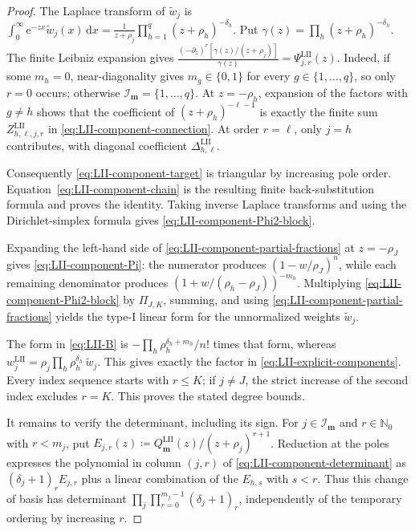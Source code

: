 \documentclass[10pt]{amsart}
\newcommand{\Nzero}{\mathbb N_0}
\newcommand{\e}{\mathrm e}
\newcommand{\dd}{\,\mathrm d}
\newcommand{\mm}{\boldsymbol m}
\theoremstyle{plain}
\theoremstyle{definition}
\theoremstyle{remark}
\begin{document}
\begin{proof}
The Laplace transform of \(\widetilde w_j\) is
\(\int_0^\infty\e^{-zx}\widetilde w_j(x)\dd x
=\frac1{z+\rho_j}\prod_{h=1}^q(z+\rho_h)^{-\delta_h}\).
Put \(\gamma(z)=\prod_h(z+\rho_h)^{-\delta_h}\).  The finite Leibniz
expansion gives
\(\frac{(-\partial_z)^r[\gamma(z)/(z+\rho_j)]}{\gamma(z)}
=\Psi_{j,r}^{\mathrm{LII}}(z)\).
Indeed, if some \(m_h=0\), near-diagonality gives
\(m_g\in\{0,1\}\) for every \(g\in\{1,\ldots,q\}\), so only
\(r=0\) occurs; otherwise
\(\mathcal I_{\mm}=\{1,\ldots,q\}\).
At \(z=-\rho_h\), expansion of the factors with \(g\ne h\) shows that
the coefficient of \((z+\rho_h)^{-\ell-1}\) is exactly the finite sum
\(Z_{h,\ell,j,r}^{\mathrm{LII}}\) in
\eqref{eq:LII-component-connection}.  At order \(r=\ell\), only
\(j=h\) contributes, with diagonal coefficient
\(\Delta_{h,\ell}^{\mathrm{LII}}\).

Consequently \eqref{eq:LII-component-target} is triangular by increasing
pole order.
Equation~\eqref{eq:LII-component-chain} is the resulting finite
back-substitution formula and proves the identity.
Taking inverse Laplace transforms and using the Dirichlet-simplex
formula gives \eqref{eq:LII-component-Phi2-block}.

Expanding the left-hand side of
\eqref{eq:LII-component-partial-fractions} at
\(z=-\rho_J\) gives \eqref{eq:LII-component-Pi}: the numerator produces
\((1-w/\rho_J)^n\), while each remaining denominator produces
\((1+w/(\rho_h-\rho_J))^{-m_h}\).  Multiplying
\eqref{eq:LII-component-Phi2-block} by \(\Pi_{J,K}\), summing, and using
\eqref{eq:LII-component-partial-fractions} yields the type-I linear form
for the unnormalized weights \(\widetilde w_j\).

The form in \eqref{eq:LII-B} is
\(-\prod_h\rho_h^{\delta_h+m_h}/n!\) times that form, whereas
\(w_j^{\mathrm{LII}}
=\rho_j\prod_h\rho_h^{\delta_h}\,\widetilde w_j\).
This gives exactly the factor in \eqref{eq:LII-explicit-components}.
Every index sequence starts with \(r\le K\); if \(j\ne J\), the strict
increase of the second index excludes \(r=K\). This proves the stated degree
bounds.

It remains to verify the determinant, including its sign. For
\(j\in\mathcal I_{\mm}\) and \(r\in\Nzero\) with \(r<m_j\), put
\(E_{j,r}(z)\coloneq Q_{\mm}^{\mathrm{LII}}(z)/(z+\rho_j)^{r+1}\).
Reduction at the poles expresses the polynomial in column \((j,r)\) of
\eqref{eq:LII-component-determinant} as
\((\delta_j+1)_rE_{j,r}\) plus a linear combination of the \(E_{h,s}\)
with \(s<r\).
Thus this change of basis has determinant
\(\prod_j\prod_{r=0}^{m_j-1}(\delta_j+1)_r\), independently of the
temporary ordering by increasing \(r\).


\end{proof}
\end{document}
